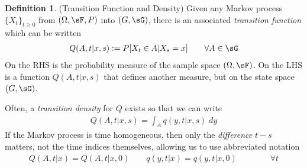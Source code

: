 \documentclass[12pt]{article}
\theoremstyle{plain}
\theoremstyle{definition}
\newtheorem{defn}[thm]{Definition}
\theoremstyle{remark}
\begin{document}
\begin{defn}(Transition Function and Density)
Given any Markov process $\{X_t\}_{t\geq 0}$ from $(\Omega,\sF,P)$ into
$(G,\sG)$, there is an associated \emph{transition function} which can
be written
\begin{align*}
  Q(A,t|x,s)
  := P[X_t\in A|X_s=x]
  \qquad
  \forall
  A\in\sG
\end{align*}
On the RHS is the probability measure of the sample space
$(\Omega,\sF)$. On the LHS is a function $Q(A,t|x,s)$ that defines
another measure, but on the state space $(G,\sG)$.

Often, a \emph{transition density} for $Q$ exists so that we can write
\begin{align*}
  Q(A,t|x,s)
  =
  \int_A q(y,t|x,s)\;dy
\end{align*}
If the Markov process is time homogeneous, then only the
\emph{difference} $t-s$ matters, not the time indices themselves,
allowing us to use abbreviated notation
\begin{align}
  Q(A,t|x)
  =
  Q(A,t|x,0)
  \qquad
  q(y,t|x)
  =
  q(y,t|x,0)
  \qquad
  \qquad
  \forall t
  \label{transitionhomog}
\end{align}
\end{defn}
\end{document}
